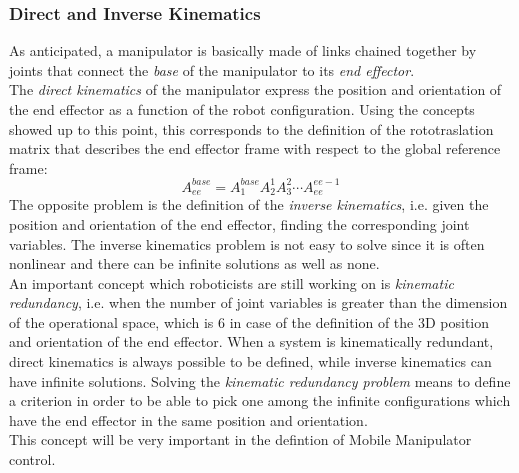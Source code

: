 \subsubsection{Direct and Inverse Kinematics} \label{dirinvkin}
As anticipated, a manipulator is basically made of links chained together by joints that connect the \textit{base} of the manipulator to its \textit{end effector}.\\
The \textit{direct kinematics} of the manipulator express the position and orientation of the end effector as a function of the robot configuration. Using the concepts showed up to this point, this corresponds to the definition of the rototraslation matrix that describes the end effector frame with respect to the global reference frame:
\begin{equation}
	A_{ee}^{base}=A_1^{base}A_2^1A_3^2\cdots A_{ee}^{ee-1}
\end{equation}
The opposite problem is the definition of the \textit{inverse kinematics}, i.e. given the position and orientation of the end effector, finding the corresponding joint variables. The inverse kinematics problem is not easy to solve since it is often nonlinear and there can be infinite solutions as well as none.\\
An important concept which roboticists are still working on is \textit{kinematic redundancy}, i.e. when the number of joint variables is greater than the dimension of the operational space, which is 6 in case of the definition of the 3D position and orientation of the end effector. 
When a system is kinematically redundant, direct kinematics is always possible to be defined, while inverse kinematics can have infinite solutions.
Solving the \textit{kinematic redundancy problem} means to define a criterion in order to be able to pick one among the infinite configurations which have the end effector in the same position and orientation.\\
This concept will be very important in the defintion of Mobile Manipulator control.
